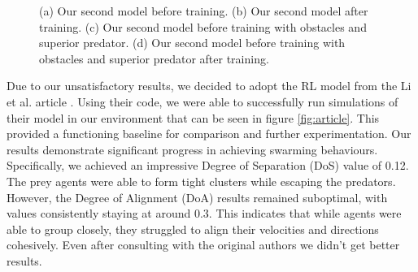 \documentclass[9pt]{pnas-new}
\begin{document}
\begin{figure}[ht]
		\caption{(a) Our second model before training. (b) Our second model after training. (c) Our second model before training with obstacles and superior predator. (d) Our second model before training with obstacles and superior predator after training. }
		\label{fig:second}
	\end{figure}
	
	Due to our unsatisfactory results, we decided to adopt the RL model from the Li et al. article \cite{li2023predator}.
	Using their code, we were able to successfully run simulations of their model in our environment that can be seen in figure \ref{fig:article}. 
	This provided a functioning baseline for comparison and further experimentation.
	Our results demonstrate significant progress in achieving swarming behaviours. 
	Specifically, we achieved an impressive Degree of Separation (DoS) value of 0.12.
	The prey agents were able to form tight clusters while escaping the predators.
	However, the Degree of Alignment (DoA) results remained suboptimal, with values consistently staying at around 0.3.
	This indicates that while agents were able to group closely, they struggled to align their velocities and directions cohesively. 
	Even after consulting with the original authors we didn't get better results.
	
\end{document}
